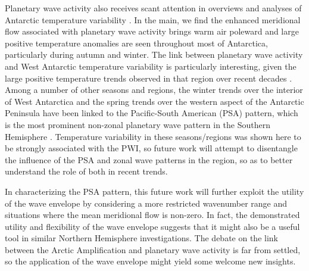 Planetary wave activity also receives scant attention in overviews and analyses of Antarctic temperature variability \citep[e.g.][]{Russell2010,SchneiderOkumura2012,Yu2012}. In the main, we find the enhanced meridional flow associated with planetary wave activity brings warm air poleward and large positive temperature anomalies are seen throughout most of Antarctica, particularly during autumn and winter. The link between planetary wave activity and West Antarctic temperature variability is particularly interesting, given the large positive temperature trends observed in that region over recent decades \citep[e.g.][]{Bromwich2013}. Among a number of other seasons and regions, the winter trends over the interior of West Antarctica \citep{Ding2011} and the spring trends over the western aspect of the Antarctic Peninsula \citep{Ding2013} have been linked to the Pacific-South American (PSA) pattern, which is the most prominent non-zonal planetary wave pattern in the Southern Hemisphere \citep[e.g.][]{Mo2001}. Temperature variability in these seasons/regions was shown here to be strongly associated with the PWI, so future work will attempt to disentangle the influence of the PSA and zonal wave patterns in the region, so as to better understand the role of both in recent trends.    

In characterizing the PSA pattern, this future work will further exploit the utility of the wave envelope by considering a more restricted wavenumber range and situations where the mean meridional flow is non-zero. In fact, the demonstrated utility and flexibility of the wave envelope suggests that it might also be a useful tool in similar Northern Hemisphere investigations. The debate on the link between the Arctic Amplification and planetary wave activity is far from settled, so the application of the wave envelope might yield some welcome new insights.    
